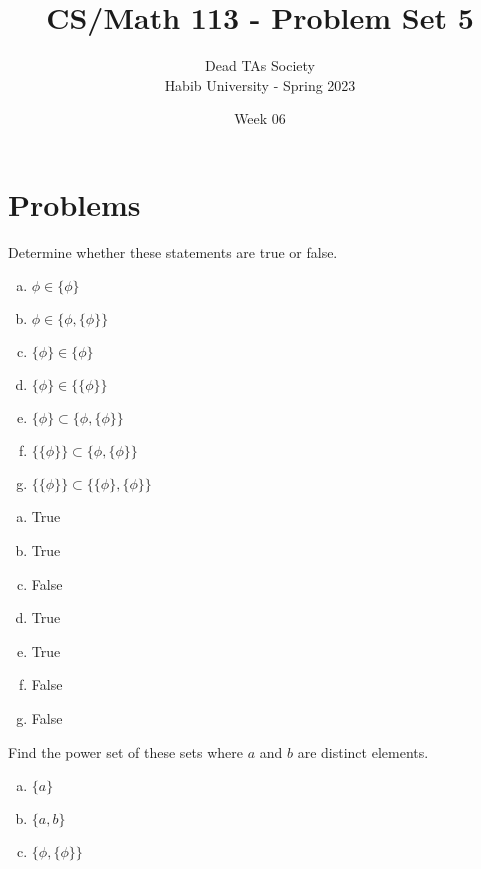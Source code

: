\documentclass[addpoints]{exam}
\title{CS/Math 113 - Problem Set 5}
\author{Dead TAs Society \\ Habib University - Spring 2023}
\date{Week 06}
\newenvironment{problem}[2][Problem]{\begin{trivlist}
\item[\hskip \labelsep {\bfseries #1}\hskip \labelsep {\bfseries #2.}]}{\end{trivlist}}
\begin{document}
\maketitle
\begin{sloppypar}
\section*{Problems}

\begin{problem}{1}[Chapter 2.1, Question 10]
    Determine whether these statements are true or false.
    \begin{enumerate}[(a)]
        \item $ \phi \in \{\phi\}$
        \item $ \phi \in \{ \phi,\{\phi\} \}$
        \item $ \{ \phi \} \in \{ \phi \} $
        \item $ \{ \phi \} \in \{\{ \phi \}\} $
        \item $ \{ \phi \} \subset \{ \phi, \{\phi \} \} $
        \item $ \{ \{ \phi \} \} \subset \{ \phi, \{ \phi \}\} $
        \item $ \{ \{ \phi \} \} \subset \{ \{\phi \}, \{ \phi \}\} $
    \end{enumerate}
    \end{problem}

    \begin{questions}
        \question
        \begin{solution}
            \begin{enumerate}[(a)]
                \item True
                \item True
                \item False
                \item True
                \item True
                \item False
                \item False
            \end{enumerate}
        \end{solution}
    \end{questions}
    \pagebreak
    \begin{problem}{2}[Chapter 2.1, Question 21]
    Find the power set of these sets where $a$ and $b$ are distinct elements.
    \begin{enumerate}[(a)]
        \item $\{a\}$
        \item $\{a,b\}$
        \item $\{ \phi, \{ \phi \}\}$
    \end{enumerate}
    \end{problem}


\end{sloppypar}
\end{document}
